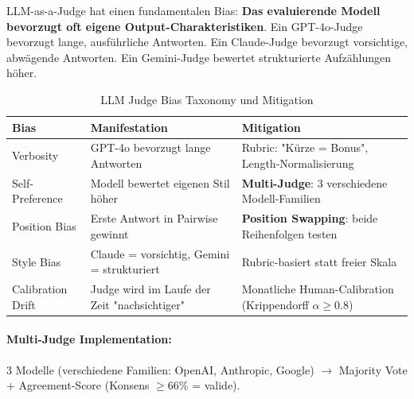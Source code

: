 LLM-as-a-Judge hat einen fundamentalen Bias: \textbf{Das evaluierende Modell bevorzugt oft eigene Output-Charakteristiken}. Ein GPT-4o-Judge bevorzugt lange, ausführliche Antworten. Ein Claude-Judge bevorzugt vorsichtige, abwägende Antworten. Ein Gemini-Judge bewertet strukturierte Aufzählungen höher.

\begin{table}[H]
\centering
\begin{tabularx}{\linewidth}{lXX}
\toprule
\textbf{Bias} & \textbf{Manifestation} & \textbf{Mitigation} \\
\midrule
Verbosity & GPT-4o bevorzugt lange Antworten & Rubric: "Kürze = Bonus", Length-Normalisierung \\
Self-Preference & Modell bewertet eigenen Stil höher & \textbf{Multi-Judge}: 3 verschiedene Modell-Familien \\
Position Bias & Erste Antwort in Pairwise gewinnt & \textbf{Position Swapping}: beide Reihenfolgen testen \\
Style Bias & Claude = vorsichtig, Gemini = strukturiert & Rubric-basiert statt freier Skala \\
Calibration Drift & Judge wird im Laufe der Zeit "nachsichtiger" & Monatliche Human-Calibration (Krippendorff $\alpha \geq 0.8$) \\
\bottomrule
\end{tabularx}
\caption{LLM Judge Bias Taxonomy und Mitigation}
\end{table}

\paragraph{Multi-Judge Implementation:} 3 Modelle (verschiedene Familien: OpenAI, Anthropic, Google) $\to$ Majority Vote + Agreement-Score (Konsens $\geq 66\%$ = valide).

